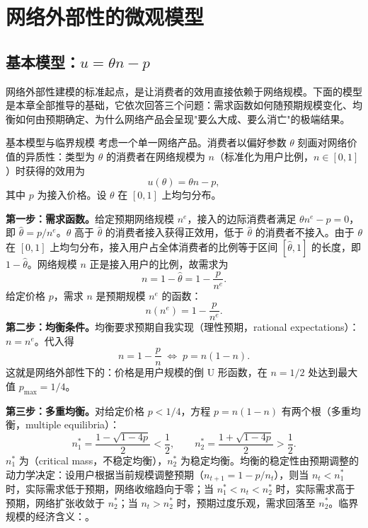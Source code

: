 \section{网络外部性的微观模型}

\subsection{基本模型：$u = \theta n - p$}

网络外部性建模的标准起点，是让消费者的效用直接依赖于网络规模。下面的模型是本章全部推导的基础，它依次回答三个问题：需求函数如何随预期规模变化、均衡如何由预期确定、为什么网络产品会呈现"要么大成、要么消亡"的极端结果。

\begin{derivation}{基本模型与临界规模}{}
考虑一个单一网络产品。消费者以偏好参数 $\theta$ 刻画对网络价值的异质性：类型为 $\theta$ 的消费者在网络规模为 $n$（标准化为用户比例，$n \in [0,1]$）时获得的效用为
\[
u(\theta) = \theta n - p,
\]
其中 $p$ 为接入价格。设 $\theta$ 在 $[0,1]$ 上均匀分布。

\textbf{第一步：需求函数。}给定预期网络规模 $n^e$，接入的边际消费者满足 $\theta n^e - p = 0$，即 $\hat\theta = p/n^e$。$\theta$ 高于 $\hat\theta$ 的消费者接入获得正效用，低于 $\hat\theta$ 的消费者不接入。由于 $\theta$ 在 $[0,1]$ 上均匀分布，接入用户占全体消费者的比例等于区间 $[\hat\theta, 1]$ 的长度，即 $1 - \hat\theta$。网络规模 $n$ 正是接入用户的比例，故需求为
\[
n = 1 - \hat\theta = 1 - \frac{p}{n^e}.
\]
给定价格 $p$，需求 $n$ 是预期规模 $n^e$ 的函数：
\[
n(n^e) = 1 - \frac{p}{n^e}.
\]
\textbf{第二步：均衡条件。}均衡要求预期自我实现（理性预期，rational expectations）：$n = n^e$。代入得
\[
n = 1 - \frac{p}{n} \;\Longleftrightarrow\; p = n(1-n).
\]
这就是网络外部性下的：价格是用户规模的倒 U 形函数，在 $n = 1/2$ 处达到最大值 $p_{\max} = 1/4$。

\textbf{第三步：多重均衡。}对给定价格 $p < 1/4$，方程 $p = n(1-n)$ 有两个根（多重均衡，multiple equilibria）：
\[
n_1^* = \frac{1 - \sqrt{1-4p}}{2} < \frac12, \qquad
n_2^* = \frac{1 + \sqrt{1-4p}}{2} > \frac12.
\]
$n_1^*$ 为（critical mass，不稳定均衡），$n_2^*$ 为稳定均衡。均衡的稳定性由预期调整的动力学决定：设用户根据当前规模调整预期（$n_{t+1} = 1 - p/n_t$），则当 $n_t < n_1^*$ 时，实际需求低于预期，网络收缩趋向于零；当 $n_1^* < n_t < n_2^*$ 时，实际需求高于预期，网络扩张收敛于 $n_2^*$；当 $n_t > n_2^*$ 时，预期过度乐观，需求回落至 $n_2^*$。临界规模的经济含义：。
\end{derivation}


